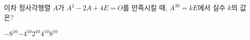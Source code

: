 \hspace*{2mm}\begin{minipage}[t]{\dimexpr\linewidth-2mm\relax}\vspace{0pt}
이차 정사각행렬 $A$가 $A^2-2A+4E=O$를 만족시킬 때, $A^{30}=kE$에서 실수 $k$의 값은?
\begin{choices32}{$-8^{10}$}{$-4^{10}$}{$2^{10}$}{$4^{10}$}{$8^{10}$}\end{choices32}\end{minipage}
